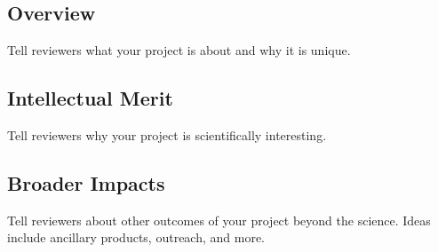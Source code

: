 
\subsection*{Overview}

Tell reviewers what your project is about and why it is unique.

\subsection*{Intellectual Merit}

Tell reviewers why your project is scientifically interesting.

\subsection*{Broader Impacts}

Tell reviewers about other outcomes of your project beyond the science. Ideas include ancillary products, outreach, and more.
